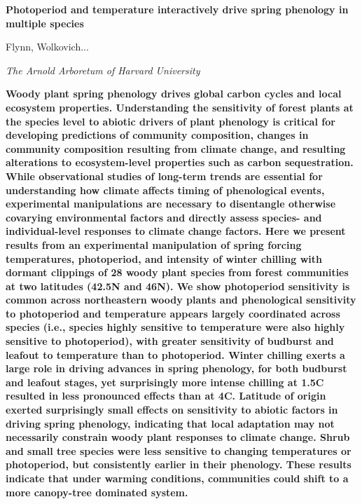 \documentclass{article}
\begin{document}

\flushleft
\textbf{\large{Photoperiod and temperature interactively drive spring phenology in multiple species}}

Flynn, Wolkovich...

\textit{The Arnold Arboretum of Harvard University}

\textbf{
Woody plant spring phenology drives global carbon cycles and local ecosystem properties. Understanding the sensitivity of forest plants at the species level to abiotic drivers of plant phenology is critical for developing predictions of community composition, changes in community composition resulting from climate change, and resulting alterations to ecosystem-level properties such as carbon sequestration. While observational studies of long-term trends are essential for understanding how climate affects timing of phenological events, experimental manipulations are necessary to disentangle otherwise covarying environmental factors and directly assess species- and individual-level responses to climate change factors.
Here we present results from an experimental manipulation of spring forcing temperatures, photoperiod, and intensity of winter chilling with dormant clippings of 28 woody plant species from forest communities at two latitudes (42.5\degree N and 46\degree N). We show photoperiod sensitivity is common across northeastern woody plants and phenological sensitivity to photoperiod and temperature appears largely coordinated across species (i.e., species highly sensitive to temperature were also highly sensitive to photoperiod), with greater sensitivity of budburst and leafout to temperature than to photoperiod. Winter chilling exerts a large role in driving advances in spring phenology, for both budburst and leafout stages, yet surprisingly more intense chilling at 1.5\degree C resulted in less pronounced effects than at 4\degree C. Latitude of origin exerted surprisingly small effects on sensitivity to abiotic factors in driving spring phenology, indicating that local adaptation may not necessarily constrain woody plant responses to climate change. Shrub and small tree species were less sensitive to changing temperatures or photoperiod, but consistently earlier in their phenology. These results indicate that under warming conditions, communities could shift to a more canopy-tree dominated system.
}

\end{document}
